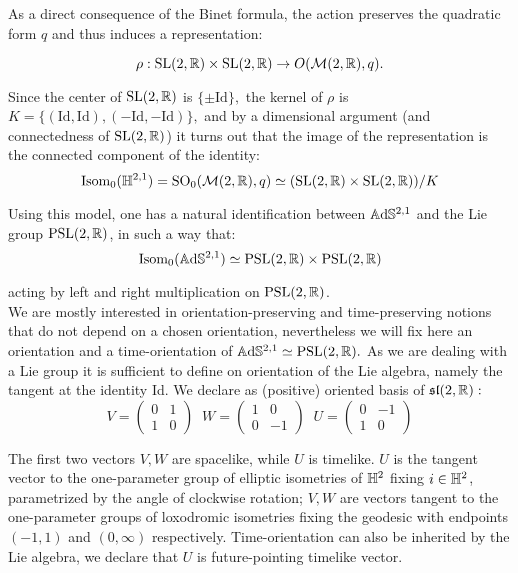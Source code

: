 As a direct consequence of the Binet formula, the action preserves the quadratic form $q$    and thus induces a representation: 

\[ \rho:\text{SL}(2,\mathbb{R})\times \text{SL}(2,\mathbb{R})\to O(\mathcal{M}(2,\mathbb{R}),q). \]

Since the center of $\text{SL}(2,\mathbb{R})$ is $\{\pm \text{Id}\},$ the kernel of $\rho$ is $K=\{(\text{Id},\text{Id}),(-\text{Id},-\text{Id})\},$ and by a dimensional argument (and connectedness of $\text{SL}(2,\mathbb{R})$) it turns out that the image of the representation is the connected component of the identity: 
\[
    \text{Isom}_0(\mathbb{H}^{2,1})=\text{SO}_0(\mathcal{M}(2,\mathbb{R}),q)\simeq (\text{SL}(2,\mathbb{R})\times \text{SL}(2,\mathbb{R}))/K
\]
    
Using this model, one has a natural identification between $\mathbb{A}\mathrm{d}\mathbb{S}^{2,1}$ and the Lie group $\text{PSL}(2,\mathbb{R})$, in such a way that: 
\begin{equation}\label{isomiso}
    \text{Isom}_0(\mathbb{A}\mathrm{d}\mathbb{S}^{2,1})\simeq \text{PSL}(2,\mathbb{R})\times\text{PSL}(2,\mathbb{R})
\end{equation}
    
acting by left and right multiplication on $\text{PSL}(2,\mathbb{R})$.\\ We are mostly interested in orientation-preserving and time-preserving notions that do not depend on a chosen orientation, nevertheless we will fix here an orientation and a time-orientation of $\mathbb{A}\mathrm{d}\mathbb{S}^{2,1}\simeq\text{PSL}(2,\mathbb{R}).$ As we are dealing with a Lie group it is sufficient to define on orientation of the Lie algebra, namely the tangent at the identity Id. We declare as (positive) oriented basis of $\mathfrak{sl}(2,\mathbb{R}):$ 
\begin{equation}\label{tangent}
V=\begin{pmatrix}
  0 & 1 \\ 1 & 0
\end{pmatrix}\;\;
W=\begin{pmatrix}
1 & 0 \\ 0 & -1
\end{pmatrix}
\;\;
U=\begin{pmatrix}
0 & -1 \\ 1 & 0
\end{pmatrix}
\end{equation}

The first two vectors $V,W$ are spacelike, while $U$ is timelike. $U$ is the tangent vector to the one-parameter group of elliptic isometries of $\mathbb{H}^2$ fixing $i\in\mathbb{H}^2$, parametrized by the angle of clockwise rotation; $V,W$ are vectors tangent to the one-parameter groups of loxodromic isometries fixing the geodesic with endpoints $(-1,1)$ and $(0,\infty)$ respectively. Time-orientation can also be inherited by the Lie algebra, we declare that $U$ is future-pointing timelike vector. \\

